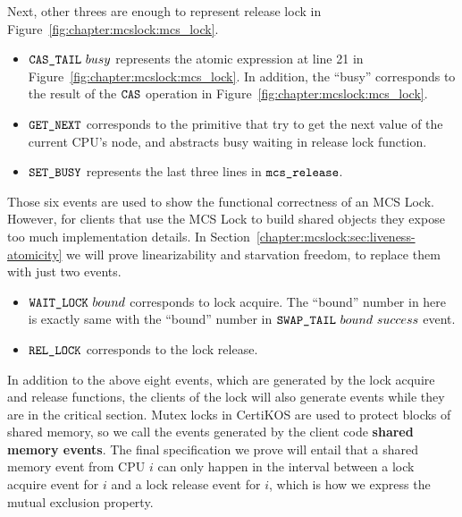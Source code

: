 Next, other threes are enough to represent release lock in Figure~\ref{fig:chapter:mcslock:mcs_lock}.

\begin{itemize}

\item \textbf{${\mathrm{\texttt{CAS\_TAIL}}}~{busy}$} represents the atomic expression at line 21  in Figure~\ref{fig:chapter:mcslock:mcs_lock}. 
In addition, the ``busy'' corresponds to the result of the ${\mathrm{\texttt{CAS}}}$ operation in Figure~\ref{fig:chapter:mcslock:mcs_lock}.

\item  \textbf{${\mathrm{\texttt{GET\_NEXT}}}$} corresponds to the primitive that try to get the next value of the current CPU's node, and abstracts busy waiting in release lock function.

\item  \textbf{${\mathrm{\texttt{SET\_BUSY}}}$} represents the last three lines in ${\mathrm{\texttt{mcs\_release}}}$.
\end{itemize}

Those six events are used to show the functional correctness of
an MCS Lock. However, for clients that use the MCS Lock to build shared
objects they expose too much implementation details.
In Section~\ref{chapter:mcslock:sec:liveness-atomicity} we will prove linearizability and
starvation freedom,  to replace them
with just two events.


\begin{itemize} 
\item \textbf{${\mathrm{\texttt{WAIT\_LOCK}}}~{bound}$} corresponds to lock acquire. The ``bound'' number in here is exactly same with the ``bound'' number in ${\mathrm{\texttt{SWAP\_TAIL}}}~{bound}~{success}$ event.

\item \textbf{${\mathrm{\texttt{REL\_LOCK}}}$} corresponds to the lock release.
\end{itemize}

In addition to the above eight events, which are generated by the lock
acquire and release functions, the clients of the lock will also
generate events while they are in the critical section. Mutex locks in
CertiKOS are used to protect blocks of shared memory, so we call the
events generated by the client code \textbf{shared memory events}. The
final specification we prove will entail that a shared memory event
from CPU $i$ can only happen in the interval between a lock acquire
event for $i$ and a lock release event for $i$, which is how we
express the mutual exclusion property.